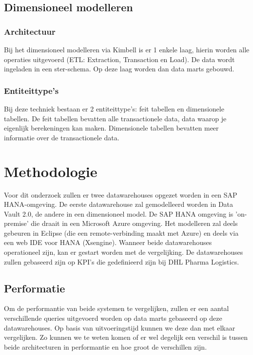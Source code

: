 \subsection{Dimensioneel modelleren}
\subsubsection{Architectuur}
Bij het dimensioneel modelleren via Kimbell is er 1 enkele laag, hierin worden alle operaties uitgevoerd (ETL: Extraction, Transaction en Load). De data wordt ingeladen in een ster-schema. Op deze laag worden dan data marts gebouwd. \autocite{Jukic2006}

\subsubsection{Entiteittype's}
Bij deze techniek bestaan er 2 entiteittype's: feit tabellen en dimensionele tabellen. De feit tabellen bevatten alle transactionele data, data waarop je eigenlijk berekeningen kan maken. Dimensionele tabellen bevatten meer informatie over de transactionele data.



\section{Methodologie}
\label{sec:methodologie}
Voor dit onderzoek zullen er twee datawarehouses opgezet worden in een SAP HANA-omgeving. De eerste datawarehouse zal gemodelleerd worden in Data Vault 2.0, de andere in een dimensioneel model. De SAP HANA omgeving is 'on-premise' die draait in een Microsoft Azure omgeving. Het modelleren zal deels gebeuren in Eclipse (die een remote-verbinding maakt met Azure) en deels via een web IDE voor HANA (Xsengine). Wanneer beide datawarehouses operationeel zijn, kan er gestart worden met de vergelijking. De datawarehouses zullen gebaseerd zijn op KPI's die gedefinieerd zijn bij DHL Pharma Logistics.

\subsection{Performatie}
Om de performantie van beide systemen te vergelijken, zullen er een aantal verschillende queries uitgevoerd worden op data marts gebaseerd op deze datawarehouses. Op basis van uitvoeringstijd kunnen we deze dan met elkaar vergelijken. Zo kunnen we te weten komen of er wel degelijk een verschil is tussen beide architecturen in performantie en hoe groot de verschillen zijn. 

